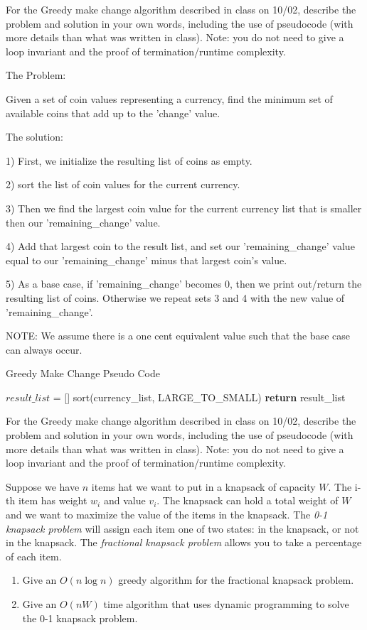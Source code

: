 \documentclass{article}
\begin{document}
\nextprob
For the Greedy make change algorithm described in class on 10/02, describe the
problem and solution in your own words, including the use of pseudocode (with
more details than what was written in class).  Note: you do not need to give a
loop invariant and the proof of termination/runtime complexity.

The Problem:

Given a set of coin values representing a currency, find the minimum set of available coins that add up to the 'change' value.

The solution:

1) First, we initialize the resulting list of coins as empty.

2) sort the list of coin values for the current currency.

3) Then we find the largest coin value for the current currency list that is smaller then our 'remaining\_change' value.

4) Add that largest coin to the result list, and set our 'remaining\_change' value equal to our 'remaining\_change' minus that largest coin's value.

5) As a base case, if 'remaining\_change' becomes 0, then we print out/return the resulting list of coins. Otherwise we repeat sets 3 and 4 with the new value of 'remaining\_change'. 

NOTE: We assume there is a one cent equivalent value such that the base case can always occur.

\begin{algorithm}
        \caption{Greedy Make Change Pseudo Code}
        \begin{algorithmic}
            \State $result\_list$ = []
            \State sort(currency_list, LARGE_TO_SMALL) 
            \State \textbf{return} result\_list
        \EndProcedure
    \end{algorithmic}
\end{algorithm}


\nextprob
For the Greedy make change algorithm described in class on 10/02, describe the
problem and solution in your own words, including the use of pseudocode (with
more details than what was written in class).  Note: you do not need to give a
loop invariant and the proof of termination/runtime complexity.

\nextprob
Suppose we have $n$ items hat we want to put in a knapsack of capacity $W$.  The i-th item has
weight $w_i$ and value $v_i$.  The knapsack can hold a total weight of $W$ and
we want to maximize the value of the items in the knapsack.
The \emph{0-1 knapsack problem} will assign each item one of two states: in the
knapsack, or not in the knapsack.  The \emph{fractional knapsack problem} allows
you to take a percentage of each item.
\begin{enumerate}
    \item Give an $O(n\log n)$ greedy algorithm for the fractional knapsack problem.
    \item Give an $O(nW)$ time algorithm that uses dynamic programming to solve
        the 0-1 knapsack problem.
\end{enumerate}
\end{document}
